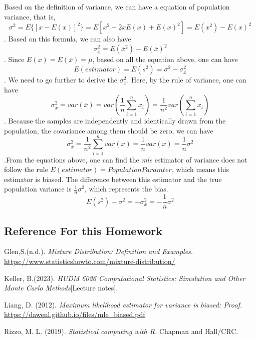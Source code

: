 \documentclass[
]{article}
\begin{document}
Based on the definition of variance, we can have a equation of
population variance, that is,
\[\sigma^2 = E\{[x - E(x)]^2\}=E[x^2-2xE(x)+E(x)^2]=E(x^2)-E(x)^2\].
Based on this formula, we can also have
\[\sigma_{\overline{x}}^2=E(\overline{x}^2)-E(\overline{x})^2\]. Since
\(E(x)=E(\overline{x})=\mu\), based on all the equation above, one can
have \[E(estimator)=E(s^2)= {\sigma}^2 - \sigma_{\overline{x}}^2\]. We
need to go further to derive the \(\sigma_{\overline{x}}^2\). Here, by
the rule of variance, one can have
\[\sigma_{\overline{x}}^2 = var(\overline{x})=var(\frac{1}{n}\sum_{i = 1}^{n}x_i)=\frac{1}{n^2}var(\sum_{i = 1}^{n}x_i)\].
Because the samples are independently and identically drawn from the
population, the covariance among them should be zero, we can have
\[\sigma_{\overline{x}}^2 =\frac{1}{n^2}\sum_{i = 1}^{n}var(x)=\frac{1}{n}var(x)=\frac{1}{n}{\sigma}^2\].From
the equations above, one can find the \emph{mle} estimator of variance
does not follow the rule \(E(estimator) = Population Paramter\), which
means this estimator is biased. The difference between this estimator
and the true population variance is \(\frac{1}{n}{\sigma}^2\), which
represents the bias.
\[E(s^2)-{\sigma}^2 = -\sigma_{\overline{x}}^2=-\frac{1}{n}{\sigma}^2\]

\hypertarget{reference-for-this-homework}{%
\subsection{Reference For this
Homework}\label{reference-for-this-homework}}

Glen,S.(n.d.). \emph{Mixture Distribution: Definition and Examples.}
\url{https://www.statisticshowto.com/mixture-distribution/}

Keller, B.(2023). \emph{HUDM 6026 Computational Statistics: Simulation
and Other Monte Carlo Methods}{[}Lecture notes{]}.

Liang, D. (2012). \emph{Maximum likelihood estimator for variance is
biased: Proof.} \url{https://dawenl.github.io/files/mle_biased.pdf}

Rizzo, M. L. (2019). \emph{Statistical computing with R.} Chapman and
Hall/CRC.
\end{document}
